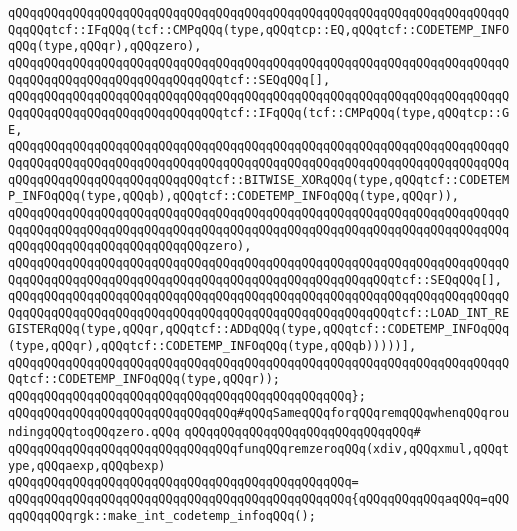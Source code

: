 \verb|qQQqqQQqqQQqqQQqqQQqqQQqqQQqqQQqqQQqqQQqqQQqqQQqqQQqqQQqqQQqqQQqqQQqqQQqqQQqtcf::IFqQQq(tcf::CMPqQQq(type,qQQqtcp::EQ,qQQqtcf::CODETEMP_INFOqQQq(type,qQQqr),qQQqzero),|\newline
\verb|qQQqqQQqqQQqqQQqqQQqqQQqqQQqqQQqqQQqqQQqqQQqqQQqqQQqqQQqqQQqqQQqqQQqqQQqqQQqqQQqqQQqqQQqqQQqqQQqqQQqtcf::SEQqQQq[],|\newline
\verb|qQQqqQQqqQQqqQQqqQQqqQQqqQQqqQQqqQQqqQQqqQQqqQQqqQQqqQQqqQQqqQQqqQQqqQQqqQQqqQQqqQQqqQQqqQQqqQQqqQQqtcf::IFqQQq(tcf::CMPqQQq(type,qQQqtcp::GE,|\newline
\verb|qQQqqQQqqQQqqQQqqQQqqQQqqQQqqQQqqQQqqQQqqQQqqQQqqQQqqQQqqQQqqQQqqQQqqQQqqQQqqQQqqQQqqQQqqQQqqQQqqQQqqQQqqQQqqQQqqQQqqQQqqQQqqQQqqQQqqQQqqQQqqQQqqQQqqQQqqQQqqQQqqQQqqQQqtcf::BITWISE_XORqQQq(type,qQQqtcf::CODETEMP_INFOqQQq(type,qQQqb),qQQqtcf::CODETEMP_INFOqQQq(type,qQQqr)),|\newline
\verb|qQQqqQQqqQQqqQQqqQQqqQQqqQQqqQQqqQQqqQQqqQQqqQQqqQQqqQQqqQQqqQQqqQQqqQQqqQQqqQQqqQQqqQQqqQQqqQQqqQQqqQQqqQQqqQQqqQQqqQQqqQQqqQQqqQQqqQQqqQQqqQQqqQQqqQQqqQQqqQQqqQQqqQQqzero),|\newline
\verb|qQQqqQQqqQQqqQQqqQQqqQQqqQQqqQQqqQQqqQQqqQQqqQQqqQQqqQQqqQQqqQQqqQQqqQQqqQQqqQQqqQQqqQQqqQQqqQQqqQQqqQQqqQQqqQQqqQQqqQQqqQQqtcf::SEQqQQq[],|\newline
\verb|qQQqqQQqqQQqqQQqqQQqqQQqqQQqqQQqqQQqqQQqqQQqqQQqqQQqqQQqqQQqqQQqqQQqqQQqqQQqqQQqqQQqqQQqqQQqqQQqqQQqqQQqqQQqqQQqqQQqqQQqqQQqtcf::LOAD_INT_REGISTERqQQq(type,qQQqr,qQQqtcf::ADDqQQq(type,qQQqtcf::CODETEMP_INFOqQQq(type,qQQqr),qQQqtcf::CODETEMP_INFOqQQq(type,qQQqb)))))],|\newline
\verb|qQQqqQQqqQQqqQQqqQQqqQQqqQQqqQQqqQQqqQQqqQQqqQQqqQQqqQQqqQQqqQQqqQQqqQQqtcf::CODETEMP_INFOqQQq(type,qQQqr));|\newline
\verb|qQQqqQQqqQQqqQQqqQQqqQQqqQQqqQQqqQQqqQQqqQQqqQQq};|\newline
\newline
\verb|qQQqqQQqqQQqqQQqqQQqqQQqqQQqqQQq#qQQqSameqQQqforqQQqremqQQqwhenqQQqroundingqQQqtoqQQqzero.qQQq|\newline
\verb|qQQqqQQqqQQqqQQqqQQqqQQqqQQqqQQq#|\newline
\verb|qQQqqQQqqQQqqQQqqQQqqQQqqQQqqQQqfunqQQqremzeroqQQq(xdiv,qQQqxmul,qQQqtype,qQQqaexp,qQQqbexp)|\newline
\verb|qQQqqQQqqQQqqQQqqQQqqQQqqQQqqQQqqQQqqQQqqQQqqQQq=|\newline
\verb|qQQqqQQqqQQqqQQqqQQqqQQqqQQqqQQqqQQqqQQqqQQqqQQq{qQQqqQQqqQQqaqQQq=qQQqqQQqqQQqrgk::make_int_codetemp_infoqQQq();|\newline
